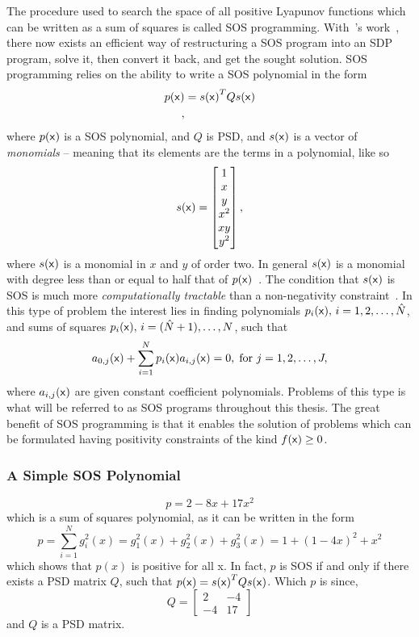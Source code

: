 The procedure used to search the space of all positive Lyapunov functions which
can be written as a sum of squares is called \ac{SOS} programming.
With~\citeauthor{parilloStructuredSemidefinitePrograms}'s
work~\cite{parilloStructuredSemidefinitePrograms}, there now exists an efficient
way of restructuring a \ac{SOS} program into an \ac{SDP} program, solve it, then
convert it back, and get the sought solution. \ac{SOS} programming relies on the
ability to write a SOS polynomial in the form
\begin{align*}
  p({\mathbf{\mathsf{x}}}) &= s{({\mathbf{\mathsf{x}}})}^{T}Qs({\mathbf{\mathsf{x}}})\\,
\end{align*}
where \(p({\mathbf{\mathsf{x}}})\) is a \ac{SOS} polynomial, and \(Q\) is \ac{PSD}, and
\(s({\mathbf{\mathsf{x}}})\) is a vector of \textit{monomials} -- meaning that its elements
are the terms in a polynomial, like so
\[
  s({\mathbf{\mathsf{x}}}) = \begin{bmatrix} 1 \\ x \\ y \\ x^2 \\ xy \\ y^2 \end{bmatrix},
\]
where \(s({\mathbf{\mathsf{x}}})\) is a monomial in \(x\) and \(y\) of order two. In general
\(s({\mathbf{\mathsf{x}}})\) is a monomial with degree less than or equal to half that of
\(p({\mathbf{\mathsf{x}}})\)~\cite{parilloStructuredSemidefinitePrograms}\label{monomialdegree}.
The condition that \(s({\mathbf{\mathsf{x}}})\) is \ac{SOS} is much more
\textit{computationally tractable} than a non-negativity
constraint~\cite{parilloStructuredSemidefinitePrograms}. In this type of problem
the interest lies in finding polynomials \(p_i({\mathbf{\mathsf{x}}}), \,
i=1,2,\ldots,\hat{N}\), and sums of squares \(p_i({\mathbf{\mathsf{x}}}), \,
i=(\hat{N}+1),\ldots,N\), such that
\[
  a_{0,j}({\mathbf{\mathsf{x}}}) + \sum_{i=1}^{N}p_{i}({\mathbf{\mathsf{x}}})a_{i,j}({\mathbf{\mathsf{x}}}) = 0, \;
  \text{for } j = 1,2,\ldots,J ,
\]
where \(a_{i,j}({\mathbf{\mathsf{x}}})\) are given constant coefficient polynomials. Problems
of this type is what will be referred to as \ac{SOS} programs throughout this
thesis. The great benefit of \ac{SOS} programming is that it enables the
solution of problems which can be formulated having positivity constraints of
the kind \(f({\mathbf{\mathsf{x}}}) \geq 0\).

\subsubsection{A Simple \ac{SOS} Polynomial}
\[
  p = 2 - 8x + 17x^2
\]
which is a sum of squares polynomial, as it can be written in the form
\[
  p = \sum_{i=1}^{N}g_i^2(x) = g_1^2(x) + g_2^2(x) + g_3^2(x)= 1 + {(1-4x)}^2 +
  x^2
\]
which shows that \(p(x)\) is positive for all x. In fact, \(p\) is \ac{SOS} if
and only if there exists a \acl{PSD} matrix \(Q\), such that \(p({\mathbf{\mathsf{x}}}) =
s{({\mathbf{\mathsf{x}}})}^{T}Qs({\mathbf{\mathsf{x}}})\). Which \(p\) is since,
\[
  Q =
  \begin{bmatrix}
    2 & -4 \\
    -4 & 17
  \end{bmatrix}
\]
and \(Q\) is a \acl{PSD} matrix.

